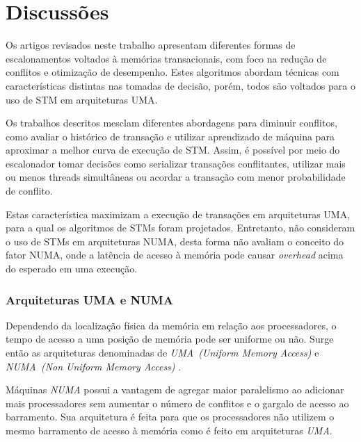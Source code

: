 \documentclass[ti]{texufpel}
\begin{document}
\chapter{Discussões}

Os artigos revisados neste trabalho apresentam diferentes formas de escalonamentos voltados à memórias transacionais, com foco na redução de conflitos e otimização de desempenho. Estes algoritmos abordam técnicas com características distintas nas tomadas de decisão, porém, todos são voltados para o uso de STM em arquiteturas UMA.

Os trabalhos descritos mesclam diferentes abordagens para diminuir conflitos, como avaliar o histórico de transação e utilizar aprendizado de máquina para aproximar a melhor curva de execução de STM. Assim, é possível por meio do escalonador tomar decisões como serializar transações conflitantes, utilizar mais ou menos threads simultâneas ou acordar a transação com menor probabilidade de conflito.

Estas característica maximizam a execução de transações em arquiteturas UMA, para a qual os algoritmos de STMs foram projetados. Entretanto, não consideram o uso de STMs em arquiteturas NUMA, desta forma não avaliam o conceito do fator NUMA, onde a latência de acesso à memória pode causar \emph{overhead} acima do esperado em uma execução.


\subsection{Arquiteturas UMA e NUMA}

Dependendo da localização física da memória em relação aos processadores, o tempo de acesso a uma posição de memória pode ser uniforme ou não. Surge então as arquiteturas denominadas de \emph{UMA~(Uniform Memory Access)} e \emph{NUMA~(Non Uniform Memory Access)} \cite{carissimi07}.

Máquinas \emph{NUMA} possui a vantagem de agregar maior paralelismo ao adicionar mais processadores sem aumentar o número de conflitos e o gargalo de acesso ao barramento. Sua arquitetura é feita para que os processadores não utilizem o mesmo barramento de acesso à memória como é feito em arquiteturas \emph{UMA}.
\end{document}
